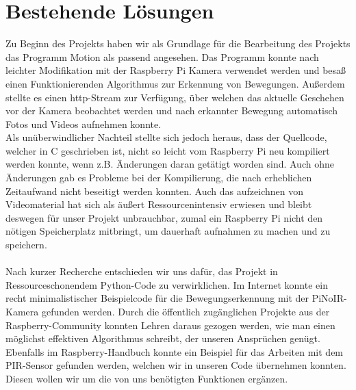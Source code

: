 \documentclass[journal, compsoc ]{IEEEtran}
\begin{document}
\section{Bestehende Lösungen} 
Zu Beginn des Projekts haben wir als Grundlage für die Bearbeitung des Projekts das Programm Motion\cite{motion} als passend angesehen. 
Das Programm konnte nach leichter Modifikation mit der Raspberry Pi Kamera verwendet werden und besaß einen Funktionierenden Algorithmus zur Erkennung von Bewegungen. 
Außerdem stellte es einen http-Stream zur Verfügung, über welchen das aktuelle Geschehen vor der Kamera beobachtet werden und nach erkannter Bewegung automatisch Fotos und Videos aufnehmen konnte. 
\\ 
Als unüberwindlicher Nachteil stellte sich jedoch heraus, dass der Quellcode, welcher in C geschrieben ist, nicht so leicht vom Raspberry Pi neu kompiliert werden konnte, wenn z.B. Änderungen daran getätigt worden sind. 
Auch ohne Änderungen gab es Probleme bei der Kompilierung, die nach erheblichen Zeitaufwand nicht beseitigt werden konnten. 
Auch das aufzeichnen von Videomaterial hat sich als äußert Ressourcenintensiv erwiesen und bleibt deswegen für unser Projekt unbrauchbar, zumal ein Raspberry Pi nicht den nötigen Speicherplatz mitbringt, um dauerhaft aufnahmen zu machen und zu speichern.
\\ \\
Nach kurzer Recherche entschieden wir uns dafür, das Projekt in Ressourceschonendem Python-Code zu verwirklichen.
Im Internet konnte ein recht minimalistischer Beispielcode für die Bewegungserkennung mit der PiNoIR-Kamera gefunden werden\cite{motioncode}.
Durch die öffentlich zugänglichen Projekte aus der Raspberry-Community konnten Lehren daraus gezogen werden, wie man einen möglichst effektiven Algorithmus schreibt, der unseren Ansprüchen genügt. 
Ebenfalls im Raspberry-Handbuch konnte ein Beispiel für das Arbeiten mit dem PIR-Sensor gefunden werden\cite[S. 495]{Raspi}, welchen wir in unseren Code übernehmen konnten.
Diesen wollen wir um die von uns benötigten Funktionen ergänzen.





%
\end{document}
